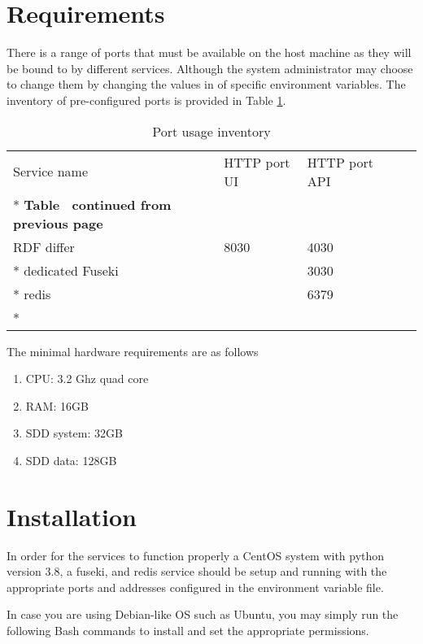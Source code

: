\section{Requirements}
\label{sec:requirements}
There is a range of ports that must be available on the host machine as they will be bound to by different services. Although the system administrator may choose to change them by changing the values in of specific environment variables. The inventory of pre-configured ports is provided in Table \ref{tab:port-inventory}.

\begin{longtable}[c]{@{}p{3.64cm}p{1.25cm}p{1.25cm}p{1.9cm}p{5cm}@{}}
	\toprule
	Service name     & HTTP port UI & HTTP port API             \\* \midrule
	\endfirsthead
	\multicolumn{5}{c}%
	{{\bfseries Table \thetable\ continued from previous page}} \\
	\endhead
	\bottomrule
	\endfoot
	\endlastfoot
	RDF differ       & 8030         & 4030                      \\* \hline
	dedicated Fuseki &              & 3030                      \\* \hline
	redis            &              & 6379                      \\* \bottomrule
	\caption{Port usage inventory}
	\label{tab:port-inventory}                                  \\
\end{longtable}

The minimal hardware requirements are as follows 
\begin{enumerate}
	\item CPU: 3.2 Ghz quad core
	\item RAM: 16GB
	\item SDD system: 32GB
	\item SDD data: 128GB
\end{enumerate}

\section{Installation}
\label{sec:installation}
In order for the services to function properly a CentOS system with python version 3.8, a fuseki, and redis service should be setup and running with the appropriate ports and addresses configured in the environment variable file. 

In case you are using Debian-like OS such as Ubuntu, you may simply run the following Bash commands to install and set the appropriate permissions.

